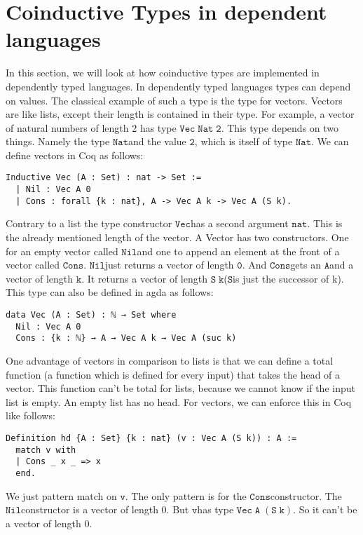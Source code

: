 \documentclass[a4paper,cleardoubleempty,BCOR1cm]{scrbook}
\begin{document}
\chapter{Coinductive Types in dependent languages}
\label{sec:orga688c27}
In this section, we will look at how coinductive types are implemented in
dependently typed languages. In dependently typed languages types can depend on
values. The classical example of such a type is the type for vectors. Vectors are like
lists, except their length is contained in their type. For example, a vector of
natural numbers of length 2 has type $\mathtt{Vec\;Nat\;2}$. This type depends on two
things. Namely the type $\mathtt{Nat}$\;and the value $\mathtt{2}$, which is itself of type $\mathtt{Nat}$.
We can define vectors in Coq as follows:
\begin{verbatim}
Inductive Vec (A : Set) : nat -> Set :=
  | Nil : Vec A 0
  | Cons : forall {k : nat}, A -> Vec A k -> Vec A (S k).
\end{verbatim}
Contrary to a list the type constructor $\mathtt{Vec}$\;has a second argument $\mathtt{nat}$.
This is the already mentioned length of the vector. A Vector has two
constructors. One for an empty vector called $\mathtt{Nil}$\;and one to append an
element at the front of a vector called $\mathtt{Cons}$. $\mathtt{Nil}$\;just returns a vector
of length $\mathtt{0}$. And $\mathtt{Cons}$\;gets an $\mathtt{A}$\;and a vector of length $\mathtt{k}$. It returns a
vector of length $\mathtt{S\;k}$\;($\mathtt{S}$\;is just the successor of k). This type can also be
defined in agda as follows:
\begin{verbatim}
data Vec (A : Set) : ℕ → Set where
  Nil : Vec A 0
  Cons : {k : ℕ} → A → Vec A k → Vec A (suc k)
\end{verbatim}
One advantage of vectors in comparison to lists is that we can define a total function
(a function which is defined for every input) that takes the head of a
vector. This function can't be total for lists, because we cannot know if the
input list is empty. An empty list has no head. For vectors, we can enforce this
in Coq like follows:
\begin{verbatim}
Definition hd {A : Set} {k : nat} (v : Vec A (S k)) : A :=
  match v with
  | Cons _ x _ => x
  end.
\end{verbatim}
We just pattern match on $\mathtt{v}$.  The only pattern is for the $\mathtt{Cons}$\;constructor.  The $\mathtt{Nil}$\;constructor
is a vector of length 0.  But $\mathtt{v}$\;has type $\mathtt{Vec\;A\;(S\;k)}$.  So it can't be a vector of length 0.
\end{document}
